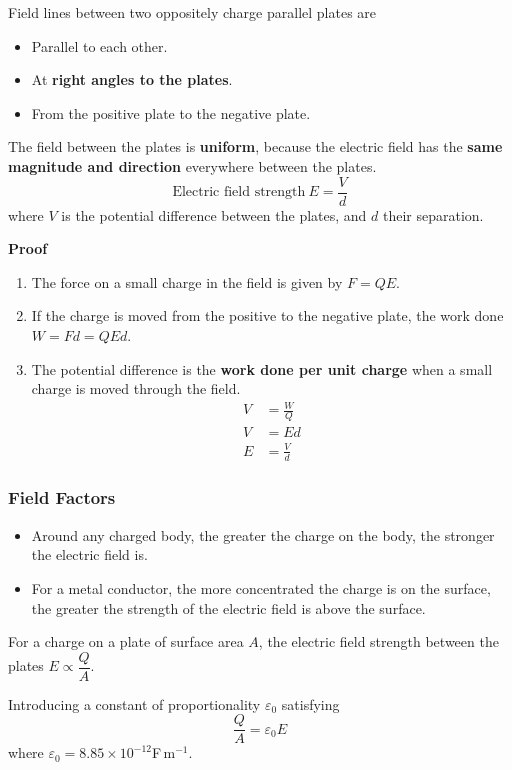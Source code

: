 Field lines between two oppositely charge parallel plates are
\begin{itemize}
    \item Parallel to each other.
    \item At \textbf{right angles to the plates}.
    \item From the positive plate to the negative plate.
\end{itemize}

The field between the plates is \textbf{uniform}, because the electric field has the \textbf{same magnitude and direction} everywhere between the plates.
$$\text{Electric field strength}\ E=\frac{V}{d}$$
where $V$ is the potential difference between the plates, and $d$ their separation.

\textbf{Proof}
\begin{enumerate}
    \item The force on a small charge in the field is given by $F=QE$.
    \item If the charge is moved from the positive to the negative plate, the work done $W=Fd=QEd$.
    \item The potential difference is the \textbf{work done per unit charge} when a small charge is moved through the field.
        \begin{align*}
            V&=\frac{W}{Q}\\
            V&=Ed\\
            E&=\frac{V}{d}
        \end{align*}
\end{enumerate}

\subsubsection*{Field Factors}
\begin{itemize}
    \item Around any charged body, the greater the charge on the body, the stronger the electric field is.
    \item For a metal conductor, the more concentrated the charge is on the surface, the greater the strength of the electric field is above the surface.
\end{itemize}
For a charge on a plate of surface area $A$, the electric field strength between the plates $E\propto\dfrac{Q}{A}$.

Introducing a constant of proportionality $\varepsilon_0$ satisfying
$$\frac{Q}{A}=\varepsilon_0E$$
where $\varepsilon_0=8.85\times10^{-12}$F\,m$^{-1}$.
